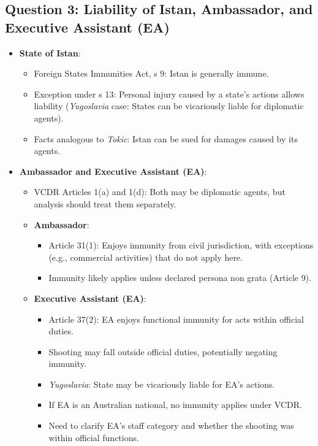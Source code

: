 \subsection{Question 3: Liability of Istan, Ambassador, and Executive Assistant (EA)}
\begin{itemize}
    \item \textbf{State of Istan}:
    \begin{itemize}
        \item Foreign States Immunities Act, s 9: Istan is generally immune.
        \item Exception under s 13: Personal injury caused by a state’s actions allows liability (\textit{Yugoslavia} case: States can be vicariously liable for diplomatic agents).
        \item Facts analogous to \textit{Tokic}: Istan can be sued for damages caused by its agents.
    \end{itemize}
    \item \textbf{Ambassador and Executive Assistant (EA)}:
    \begin{itemize}
        \item VCDR Articles 1(a) and 1(d): Both may be diplomatic agents, but analysis should treat them separately.
        \item \textbf{Ambassador}:
        \begin{itemize}
            \item Article 31(1): Enjoys immunity from civil jurisdiction, with exceptions (e.g., commercial activities) that do not apply here.
            \item Immunity likely applies unless declared persona non grata (Article 9).
        \end{itemize}
        \item \textbf{Executive Assistant (EA)}:
        \begin{itemize}
            \item Article 37(2): EA enjoys functional immunity for acts within official duties.
            \item Shooting may fall outside official duties, potentially negating immunity.
            \item \textit{Yugoslavia}: State may be vicariously liable for EA’s actions.
            \item If EA is an Australian national, no immunity applies under VCDR.
            \item Need to clarify EA’s staff category and whether the shooting was within official functions.

\end{itemize}
\end{itemize}
\end{itemize}
